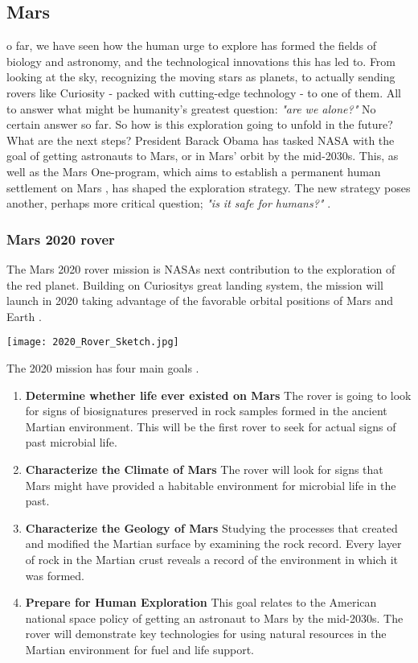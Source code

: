 \subsection{Mars}
o far, we have seen how the human urge to explore has formed the fields of biology and astronomy, and the technological innovations this has led to.
From looking at the sky, recognizing the moving stars as planets, to actually sending rovers like Curiosity - packed with cutting-edge technology - to one of them.
All to answer what might be humanity's greatest question: \emph{"are we alone?"}
No certain answer so far.
So how is this exploration going to unfold in the future?
What are the next steps?
President Barack Obama has tasked NASA with the goal of getting astronauts to Mars, or in Mars' orbit by the mid-2030s.
This, as well as the Mars One-program, which aims to establish a permanent human settlement on Mars \cite{FPlan12}, has shaped the exploration strategy.
The new strategy poses another, perhaps more critical question; \emph{"is it safe for humans?"} \cite{FPlan01}.

\subsubsection{Mars 2020 rover}

The Mars 2020 rover mission is NASAs next contribution to the exploration of the red planet. 
Building on Curiositys great landing system, the mission will launch in 2020 taking advantage of the favorable orbital positions of Mars and Earth \cite{FPlan14}. 

\begin{center}
	\texttt{[image: 2020\_Rover\_Sketch.jpg]}
\end{center}
The 2020 mission has four main goals \cite{FPlan13}.

\begin{enumerate}
	\item \textbf{Determine whether life ever existed on Mars}
The rover is going to look for signs of biosignatures preserved in rock samples formed in the ancient Martian environment.
This will be the first rover to seek for actual signs of past microbial life.
	\item \textbf{Characterize the Climate of Mars}
The rover will look for signs that Mars might have provided a habitable environment for microbial life in the past. 
	\item \textbf{Characterize the Geology of Mars}
Studying the processes that created and modified the Martian surface by examining the rock record.
Every layer of rock in the Martian crust reveals a record of the environment in which it was formed.
	\item \textbf{Prepare for Human Exploration}
This goal relates to the American national space policy of getting an astronaut to Mars by the mid-2030s.
The rover will demonstrate key technologies for using natural resources in the Martian environment for fuel and life support. 
\end{enumerate}


